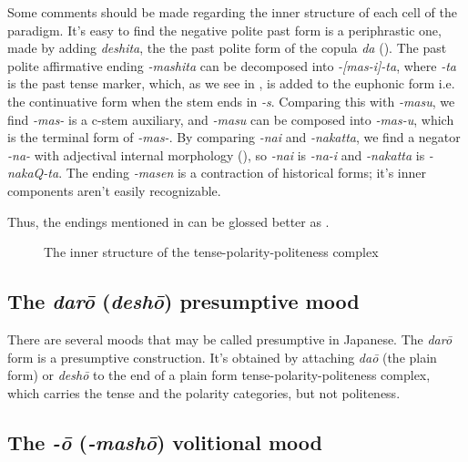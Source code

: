 \documentclass[UTF8, a4paper, oneside, scheme=plain]{ctexrep}
\newcommand{\corpus}[1]{\emph{#1}}
\begin{document}
Some comments should be made regarding the inner structure of each cell of the paradigm.
It's easy to find the negative polite past form is a periphrastic one,
made by adding \corpus{deshita}, the the past polite form of the copula \corpus{da} 
().
The past polite affirmative ending \corpus{-mashita} can be decomposed into 
\corpus{-[mas-i]-ta},
where \corpus{-ta} is the past tense marker,
which, as we see in ,
is added to the euphonic form i.e. the continuative form when the stem ends in \corpus{-s}.
Comparing this with \corpus{-masu},
we find \corpus{-mas-} is a c-stem auxiliary,
and \corpus{-masu} can be composed into \corpus{-mas-u},
which is the terminal form of \corpus{-mas-}.
By comparing \corpus{-nai} and \corpus{-nakatta},
we find a negator \corpus{-na-} with adjectival internal morphology (),
so \corpus{-nai} is \corpus{-na-i} and \corpus{-nakatta} is \corpus{-nakaQ-ta}.
The ending \corpus{-masen} is a contraction of historical forms;
it's inner components aren't easily recognizable.

Thus, the endings mentioned in  can be glossed better as 
.

\begin{figure}[H]
    \centering
    
    \caption{The inner structure of the tense-polarity-politeness complex}
    \label{fig:analyzing-tpp-complex}
\end{figure}

\subsection{The \corpus{dar\={o}} (\corpus{desh\={o}}) presumptive mood}\label{sec:daro-form}

There are several moods that may be called presumptive in Japanese.
The \corpus{dar\={o}} form is a presumptive construction.
It's obtained by attaching \corpus{da\={o}} (the plain form)
or \corpus{desh\={o}} to the end of a plain form tense-polarity-politeness complex,
which carries the tense and the polarity categories, 
but not politeness.

\subsection{The \corpus{-\={o}} (\corpus{-mash\={o}}) volitional mood}\label{sec:volition-mood}
\end{document}

